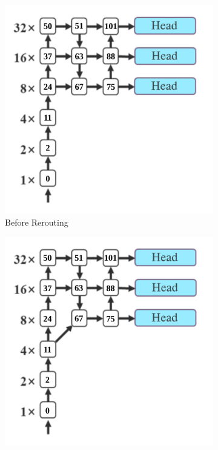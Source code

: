 \begin{figure}[H]
    \centering
    \begin{subfigure}[][][t]{0.4\textwidth}
      \includegraphics[width=1\linewidth]{figures/deeperconn-before.png}
      \caption{Before Rerouting}
      \label{fig:deeperconn-before}
    \end{subfigure}\hfill%
    \begin{subfigure}[][][t]{0.4\textwidth}
      \includegraphics[width=1\linewidth]{figures/deeperconn-after.png}

\end{subfigure}
\end{figure}
